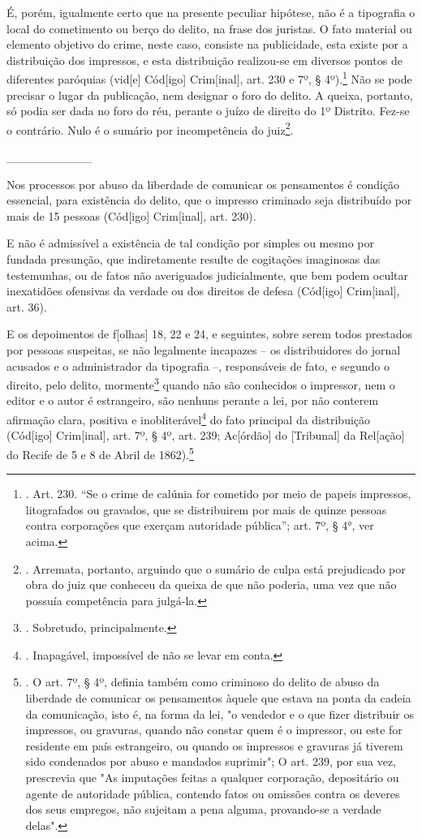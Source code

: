 É, porém, igualmente certo que na presente peculiar hipótese, não é a
tipografia o local do cometimento ou berço do delito, na frase dos
juristas. O fato material ou elemento objetivo do crime, neste caso,
consiste na publicidade, esta existe por a distribuição dos impressos, e
esta distribuição realizou-se em diversos pontos de diferentes paróquias
(vid{[}e{]} Cód{[}igo{]} Crim{[}inal{]}, art. 230 e 7º, § 4º).\footnote{.
  Art. 230. ``Se o crime de calúnia for cometido por meio de papeis
  impressos, litografados ou gravados, que se distribuirem por mais de
  quinze pessoas contra corporações que exerçam autoridade pública'';
  art. 7º, § 4°, ver acima.} Não se pode precisar o lugar da publicação,
nem designar o foro do delito. A queixa, portanto, só podia ser dada no
foro do réu, perante o juízo de direito do 1º Distrito. Fez-se o
contrário. Nulo é o sumário por incompetência do juiz\footnote{.
  Arremata, portanto, arguindo que o sumário de culpa está prejudicado
  por obra do juiz que conheceu da queixa de que não poderia, uma vez
  que não possuía competência para julgá-la.}.

\_\_\_\_\_\_\_\_\_\_

Nos processos por abuso da liberdade de comunicar os pensamentos é
condição essencial, para existência do delito, que o impresso criminado
seja distribuído por mais de 15 pessoas (Cód{[}igo{]} Crim{[}inal{]},
art. 230).

E não é admissível a existência de tal condição por simples ou mesmo por
fundada presunção, que indiretamente resulte de cogitações imaginosas
das testemunhas, ou de fatos não averiguados judicialmente, que bem
podem ocultar inexatidões ofensivas da verdade ou dos direitos de defesa
(Cód{[}igo{]} Crim{[}inal{]}, art. 36).

E os depoimentos de f{[}olhas{]} 18, 22 e 24, e seguintes, sobre serem
todos prestados por pessoas suspeitas, se não legalmente incapazes -- os
distribuidores do jornal acusados e o administrador da tipografia --,
responsáveis de fato, e segundo o direito, pelo delito,
mormente\footnote{. Sobretudo, principalmente.} quando não são
conhecidos o impressor, nem o editor e o autor é estrangeiro, são
nenhuns perante a lei, por não conterem afirmação clara, positiva e
inobliterável\footnote{. Inapagável, impossível de não se levar em
  conta.} do fato principal da distribuição (Cód{[}igo{]}
Crim{[}inal{]}, art. 7º, § 4º, art. 239; Ac{[}órdão{]} do {[}Tribunal{]}
da Rel{[}ação{]} do Recife de 5 e 8 de Abril de 1862).\footnote{. O art.
  7º, § 4º, definia também como criminoso do delito de abuso da
  liberdade de comunicar os pensamentos àquele que estava na ponta da
  cadeia da comunicação, isto é, na forma da lei, "o vendedor e o que
  fizer distribuir os impressos, ou gravuras, quando não constar quem é
  o impressor, ou este for residente em país estrangeiro, ou quando os
  impressos e gravuras já tiverem sido condenados por abuso e mandados
  suprimir"; O art. 239, por sua vez, prescrevia que "As imputações
  feitas a qualquer corporação, depositário ou agente de autoridade
  pública, contendo fatos ou omissões contra os deveres dos seus
  empregos, não sujeitam a pena alguma, provando-se a verdade delas".}

